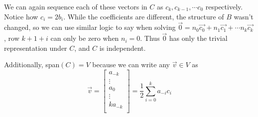 \documentclass[11pt]{article}
\newcommand{\vect}[1]{\begin{bmatrix}#1\end{bmatrix}}
\begin{document}
\begin{enumerate}[label=\arabic*.]
        We can again sequence each of these vectors in $C$ as $c_k, c_{k-1}, \cdots c_0$ respectively. Notice how $c_i = 2b_i$. While the coefficients are different, the structure of $B$ wasn't changed, so we can use similar logic to say when solving $\vec{0} = n_0\vec{c_0} + n_1\vec{c_1}+ \cdots n_k\vec{c_k}$, row $k+1+i$ can only be zero when $n_i=0$. Thus $\vec{0}$ has only the trivial representation under $C$, and $C$ is independent.
        
        Additionally, span$(C)=V$ because we can write any $\vec{v}\in V$ as 
        $$\vec{v} = \vect{a_{-k} \\ \vdots \\a_0 \\ \vdots \\ k a_{-k} \\} = \frac{1}{2}\sum^k_{i=0} a_{-i}c_i$$
        
    \end{enumerate}
\end{document}
